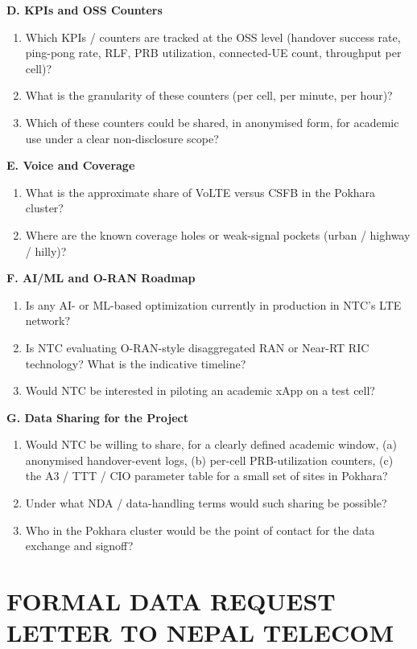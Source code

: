 \documentclass[12pt,a4paper,oneside]{report}
\begin{document}
\textbf{D. KPIs and OSS Counters}
\begin{enumerate}[leftmargin=*,resume]
    \item Which KPIs / counters are tracked at the OSS level
    (handover success rate, ping-pong rate, RLF, PRB utilization,
    connected-UE count, throughput per cell)?
    \item What is the granularity of these counters (per cell,
    per minute, per hour)?
    \item Which of these counters could be shared, in anonymised form,
    for academic use under a clear non-disclosure scope?
\end{enumerate}

\textbf{E. Voice and Coverage}
\begin{enumerate}[leftmargin=*,resume]
    \item What is the approximate share of VoLTE versus CSFB in the
    Pokhara cluster?
    \item Where are the known coverage holes or weak-signal pockets
    (urban / highway / hilly)?
\end{enumerate}

\textbf{F. AI/ML and O-RAN Roadmap}
\begin{enumerate}[leftmargin=*,resume]
    \item Is any AI- or ML-based optimization currently in production
    in NTC's LTE network?
    \item Is NTC evaluating O-RAN-style disaggregated RAN or Near-RT
    RIC technology? What is the indicative timeline?
    \item Would NTC be interested in piloting an academic xApp on a
    test cell?
\end{enumerate}

\textbf{G. Data Sharing for the Project}
\begin{enumerate}[leftmargin=*,resume]
    \item Would NTC be willing to share, for a clearly defined academic
    window, (a) anonymised handover-event logs, (b) per-cell
    PRB-utilization counters, (c) the A3 / TTT / CIO parameter table for
    a small set of sites in Pokhara?
    \item Under what NDA / data-handling terms would such sharing be
    possible?
    \item Who in the Pokhara cluster would be the point of contact for
    the data exchange and signoff?
\end{enumerate}

\chapter{FORMAL DATA REQUEST LETTER TO NEPAL TELECOM}
\end{document}

